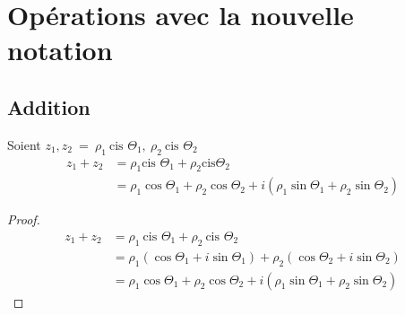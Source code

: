 \documentclass[]{article}
\newcommand{\cis}{\text{cis }}
\begin{document}
\section{Opérations avec la nouvelle notation}

\subsection{Addition}
\noindent
Soient $z_1, z_2 \ = \ \rho_1 \ \cis{\Theta_1}, \ \rho_2 \ \cis{\Theta_2}$
\begin{align*}
z_1 + z_2 &= \rho_1\cis\Theta_1+\rho_2\text{cis}\Theta_2
\\ &= \rho_1\cos{\Theta_1}+\rho_2\cos{\Theta_2} + i(\rho_1\sin{\Theta_1}+\rho_2\sin{\Theta_2})
\end{align*}
\begin{proof}
\begin{align*}
z_1 + z_2 &= \rho_1 \ \cis{\Theta_1} + \rho_2 \ \cis{\Theta_2}
\\        &= \rho_1(\cos{\Theta_1}+i\sin{\Theta_1})+\rho_2(\cos{\Theta_2}+i\sin{\Theta_2})
\\        &= \rho_1\cos{\Theta_1}+\rho_2\cos{\Theta_2} + i(\rho_1\sin{\Theta_1}+\rho_2\sin{\Theta_2})
\end{align*}
\end{proof}
\end{document}
